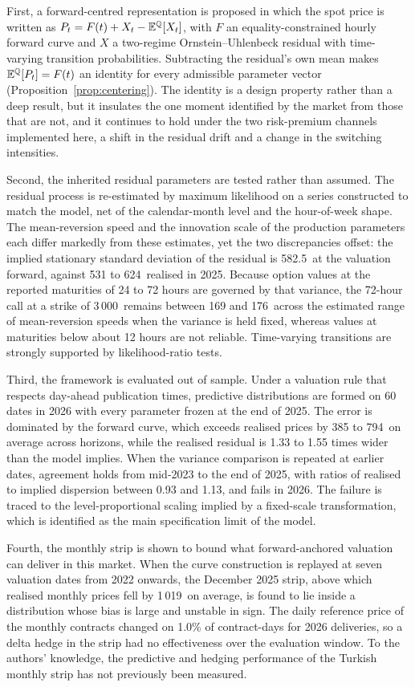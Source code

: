 First, a forward-centred representation is proposed in which the spot price is
written as $P_t = F(t) + X_t - \mathbb{E}^{\mathbb{Q}}[X_t]$, with $F$ an equality-constrained
hourly forward curve and $X$ a two-regime Ornstein--Uhlenbeck residual with
time-varying transition probabilities. Subtracting the residual's own mean
makes $\mathbb{E}^{\mathbb{Q}}[P_t]=F(t)$ an identity for every admissible parameter vector
(Proposition~\ref{prop:centering}). The identity is a design property rather
than a deep result, but it insulates the one moment identified by the market
from those that are not, and it continues to hold under the two risk-premium
channels implemented here, a shift in the residual drift and a change in the
switching intensities.

Second, the inherited residual parameters are tested rather than assumed. The
residual process is re-estimated by maximum likelihood on a series constructed
to match the model, net of the calendar-month level and the hour-of-week shape.
The mean-reversion speed and the innovation scale of the production parameters
each differ markedly from these estimates, yet the two discrepancies offset:
the implied stationary standard deviation of the residual is 582.5\,\TRY{} at
the valuation forward, against 531 to 624\,\TRY{} realised in 2025. Because
option values at the reported maturities of 24 to 72 hours are governed by that
variance, the 72-hour call at a strike of 3\,000\,\TRY{} remains between 169 and
176\,\TRY{} across the estimated range of mean-reversion speeds when the
variance is held fixed, whereas values at maturities below about 12 hours are
not reliable. Time-varying transitions are strongly supported by
likelihood-ratio tests.

Third, the framework is evaluated out of sample. Under a valuation rule that
respects day-ahead publication times, predictive distributions are formed on 60
dates in 2026 with every parameter frozen at the end of 2025. The error is
dominated by the forward curve, which exceeds realised prices by 385 to
794\,\TRY{} on average across horizons, while the realised residual is 1.33 to
1.55 times wider than the model implies. When the variance comparison is
repeated at earlier dates, agreement holds from mid-2023 to the end of 2025,
with ratios of realised to implied dispersion between 0.93 and 1.13, and fails
in 2026. The failure is traced to the level-proportional scaling implied by a
fixed-scale transformation, which is identified as the main specification limit
of the model.

Fourth, the monthly strip is shown to bound what forward-anchored valuation can
deliver in this market. When the curve construction is replayed at seven
valuation dates from 2022 onwards, the December 2025 strip, above which
realised monthly prices fell by 1\,019\,\TRY{} on average, is found to lie
inside a distribution whose bias is large and unstable in sign. The daily
reference price of the monthly contracts changed on 1.0\% of contract-days for
2026 deliveries, so a delta hedge in the strip had no effectiveness over the
evaluation window. To the authors' knowledge, the predictive and hedging
performance of the Turkish monthly strip has not previously been measured.

